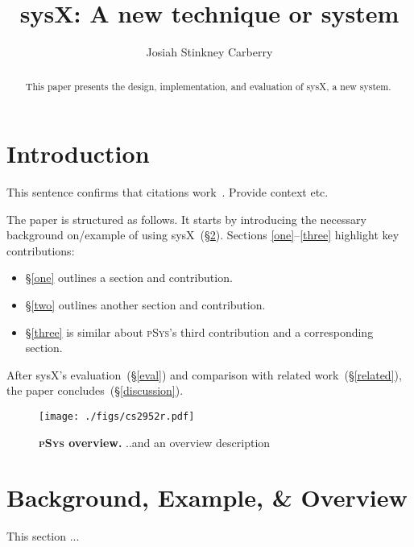 \documentclass[sigplan, review, screen, 10pt]{acmart}
\title{sysX: A new technique or system}
\author{Josiah Stinkney Carberry}
\affiliation{Brown University}
\newcommand{\sx}[1]{(\S\ref{#1})}
\newcommand{\sys}{{\scshape pSys}\xspace}
\begin{document}
\begin{abstract}
This paper presents the design, implementation, and evaluation of sysX, a new system.
\end{abstract}

\maketitle


\section{Introduction}
\label{intro}

This sentence confirms that citations work~\cite{kpn74, dryad07}. Provide
context etc.

The paper is structured as follows.
It starts by introducing the necessary background on/example of using sysX~\sx{bg}.
Sections \ref{one}--\ref{three} highlight key contributions:
\begin{itemize}
	\item
	\S\ref{one}
		outlines a section and contribution.

	\item
	\S\ref{two} outlines another section and contribution.

	\item
	\S\ref{three} is similar about \sys's third contribution and a corresponding section.

\end{itemize}

\noindent
After sysX's evaluation~\sx{eval} and  comparison with related work~\sx{related}, the paper concludes~\sx{discussion}.  

\begin{figure}[t]
\centering
\texttt{[image: ./figs/cs2952r.pdf]}
\caption{
  \textbf{\sys overview.}
  ..and an overview description
}
\vspace{-18pt}
\label{fig:overview}
\end{figure}

\section{Background, Example, \& Overview}
\label{bg}

This section ...
\end{document}

